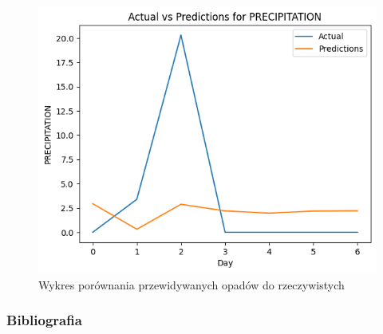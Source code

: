 \documentclass[usepdftitle=false,24pt]{beamer}
\begin{document}
\begin{frame}
\end{frame}

\begin{frame}
    \begin{figure}
        \includegraphics[width=.75\textwidth]{images/opady.png}
        \caption{Wykres porównania przewidywanych opadów do rzeczywistych}
    \end{figure}
\end{frame}

\begin{frame}[allowframebreaks]
    \frametitle{Bibliografia}
    
    

\end{frame}
\end{document}
